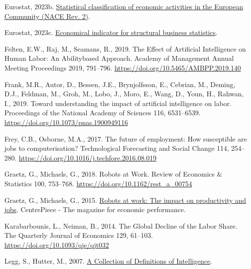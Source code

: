 \documentclass[
  11,
  a4paperpaper,
]{article}
\newlength{\cslhangindent}
\newenvironment{CSLReferences}[2] %
 {\begin{list}{}{%
  \setlength{\itemindent}{0pt}
  \setlength{\leftmargin}{0pt}
  \setlength{\parsep}{0pt}
  \ifodd #1
   \setlength{\leftmargin}{\cslhangindent}
   \setlength{\itemindent}{-1\cslhangindent}
  \fi
  \setlength{\itemsep}{#2\baselineskip}}}
 {\end{list}}
\begin{document}
\begin{CSLReferences}{1}{0}
Eurostat, 2023b.
\href{https://ec.europa.eu/eurostat/api/dissemination/sdmx/2.1/codelist/ESTAT/NACE_R2/?compressed=true&format=TSV&lang=en}{Statistical
classification of economic activities in the {European} {Community}
({NACE} {Rev}. 2)}.

Eurostat, 2023c.
\href{https://ec.europa.eu/eurostat/api/dissemination/sdmx/2.1/codelist/ESTAT/INDIC_SB/?compressed=true&format=TSV&lang=en}{Economical
indicator for structural business statistics}.

Felten, E.W., Raj, M., Seamans, R., 2019. The {Effect} of {Artificial}
{Intelligence} on {Human} {Labor}: {An} {Abilitybased} {Approach}.
Academy of Management Annual Meeting Proceedings 2019, 791--796.
\url{https://doi.org/10.5465/AMBPP.2019.140}

Frank, M.R., Autor, D., Bessen, J.E., Brynjolfsson, E., Cebrian, M.,
Deming, D.J., Feldman, M., Groh, M., Lobo, J., Moro, E., Wang, D., Youn,
H., Rahwan, I., 2019. Toward understanding the impact of artificial
intelligence on labor. Proceedings of the National Academy of Sciences
116, 6531--6539. \url{https://doi.org/10.1073/pnas.1900949116}

Frey, C.B., Osborne, M.A., 2017. The future of employment: {How}
susceptible are jobs to computerisation? Technological Forecasting and
Social Change 114, 254--280.
\url{https://doi.org/10.1016/j.techfore.2016.08.019}

Graetz, G., Michaels, G., 2018. Robots at {Work}. Review of Economics \&
Statistics 100, 753--768. \url{https://doi.org/10.1162/rest_a_00754}

Graetz, G., Michaels, G., 2015.
\href{https://ideas.repec.org//p/cep/cepcnp/447.html}{Robots at work:
The impact on productivity and jobs}. CentrePiece - The magazine for
economic performance.

Karabarbounis, L., Neiman, B., 2014. The {Global} {Decline} of the
{Labor} {Share}. The Quarterly Journal of Economics 129, 61--103.
\url{https://doi.org/10.1093/qje/qjt032}

Legg, S., Hutter, M., 2007. \href{http://arxiv.org/abs/0706.3639}{A
{Collection} of {Definitions} of {Intelligence}}.


\end{CSLReferences}
\end{document}
